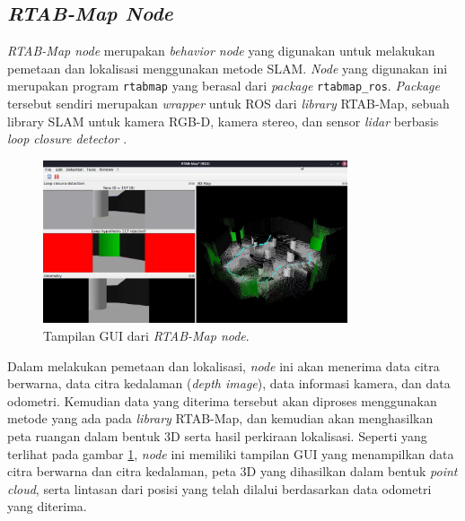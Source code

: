 \subsection{\emph{RTAB-Map Node}}
\label{subsec:rtabmapnode}

\emph{RTAB-Map node} merupakan \emph{behavior node} yang digunakan untuk melakukan pemetaan dan lokalisasi menggunakan metode SLAM.
\emph{Node} yang digunakan ini merupakan program \lstinline{rtabmap} yang berasal dari \emph{package} \lstinline{rtabmap_ros}.
\emph{Package} tersebut sendiri merupakan \emph{wrapper} untuk ROS dari \emph{library} RTAB-Map,
  sebuah library SLAM untuk kamera RGB-D, kamera stereo, dan sensor \emph{lidar} berbasis \emph{loop closure detector} \citep{cit:labbe2019}.

\begin{figure}[ht]
  \centering
  \includegraphics[width=0.8\textwidth,keepaspectratio]{gambar/tampilan-rtabmap.png}
  \caption{Tampilan GUI dari \emph{RTAB-Map node}.}
  \label{fig:tampilanrtabmap}
\end{figure}

Dalam melakukan pemetaan dan lokalisasi,
  \emph{node} ini akan menerima data citra berwarna,
  data citra kedalaman (\emph{depth image}),
  data informasi kamera,
  dan data odometri.
Kemudian data yang diterima tersebut akan diproses menggunakan metode yang ada pada \emph{library} RTAB-Map,
  dan kemudian akan menghasilkan peta ruangan dalam bentuk 3D serta hasil perkiraan lokalisasi.
Seperti yang terlihat pada gambar \ref{fig:tampilanrtabmap},
  \emph{node} ini memiliki tampilan GUI yang menampilkan data citra berwarna dan citra kedalaman,
  peta 3D yang dihasilkan dalam bentuk \emph{point cloud},
  serta lintasan dari posisi yang telah dilalui berdasarkan data odometri yang diterima.
